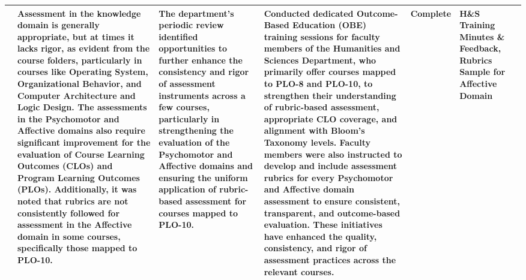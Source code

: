 \documentclass[10pt,a4paper]{article}
\begin{document}
\begin{longtable}{|P{2.3cm}|P{5.0cm}|P{4.5cm}|P{5.0cm}|P{2.4cm}|P{2.8cm}|P{1.8cm}|}
 & Assessment in the knowledge domain is generally appropriate, but at times it lacks rigor, as evident from the course folders, particularly in courses like Operating System, Organizational Behavior, and Computer Architecture and Logic Design. The assessments in the Psychomotor and Affective domains also require significant improvement for the evaluation of Course Learning Outcomes (CLOs) and Program Learning Outcomes (PLOs). Additionally, it was noted that rubrics are not consistently followed for assessment in the Affective domain in some courses, specifically those mapped to PLO-10. & The department's periodic review identified opportunities to further enhance the consistency and rigor of assessment instruments across a few courses, particularly in strengthening the evaluation of the Psychomotor and Affective domains and ensuring the uniform application of rubric-based assessment for courses mapped to PLO-10. & Conducted dedicated Outcome-Based Education (OBE) training sessions for faculty members of the Humanities and Sciences Department, who primarily offer courses mapped to PLO-8 and PLO-10, to strengthen their understanding of rubric-based assessment, appropriate CLO coverage, and alignment with Bloom's Taxonomy levels. Faculty members were also instructed to develop and include assessment rubrics for every Psychomotor and Affective domain assessment to ensure consistent, transparent, and outcome-based evaluation. These initiatives have enhanced the quality, consistency, and rigor of assessment practices across the relevant courses. & Complete & H\&S Training Minutes \& Feedback, Rubrics Sample for Affective Domain &  \\ \hline

\end{longtable}
\end{document}
